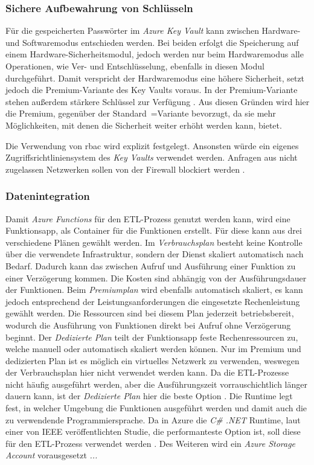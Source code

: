 \subsubsection{Sichere Aufbewahrung von Schlüsseln} \label{subsec:umsetzen:konfiguration:keyVault}
Für die gespeicherten Passwörter im \textit{Azure Key Vault} kann zwischen Hardware- und Softwaremodus entschieden werden. Bei beiden erfolgt die Speicherung auf einem Hardware-Sicherheitsmodul, jedoch werden nur beim Hardwaremodus alle Operationen, wie Ver- und Entschlüsselung, ebenfalls in diesen Modul durchgeführt. Damit verspricht der Hardwaremodus eine höhere Sicherheit, setzt jedoch die Premium-Variante des Key Vaults voraus. In der Premium-Variante stehen außerdem stärkere Schlüssel zur Verfügung \cite{haunts_key_2019}. Aus diesen Gründen wird hier die Premium, gegenüber der Standard~=Variante bevorzugt, da sie mehr Möglichkeiten, mit denen die Sicherheit weiter erhöht werden kann, bietet.

Die Verwendung von \ac{rbac} wird explizit festgelegt. Ansonsten würde ein eigenes Zugriffsrichtliniensystem des \textit{Key Vaults} verwendet werden. Anfragen aus nicht zugelassen Netzwerken sollen von der Firewall blockiert werden \cite[vgl.][]{herath_working_2022}.

\subsubsection{Datenintegration} \label{subsec:umsetzen:konfiguration:functions}
Damit \textit{Azure Functions} für den ETL-Prozess genutzt werden kann, wird eine Funktionsapp, als Container für die Funktionen erstellt. Für diese kann aus drei verschiedene Plänen gewählt werden. Im \textit{Verbrauchsplan} besteht keine Kontrolle über die verwendete Infrastruktur, sondern der Dienst skaliert automatisch nach Bedarf. Dadurch kann das zwischen Aufruf und Ausführung einer Funktion zu einer Verzögerung kommen. Die Kosten sind abhängig von der Ausführungsdauer der Funktionen. Beim \textit{Premiumplan} wird ebenfalls automatisch skaliert, es kann jedoch entsprechend der Leistungsanforderungen die eingesetzte Rechenleistung gewählt werden. Die Ressourcen sind bei diesem Plan jederzeit betriebsbereit, wodurch die Ausführung von Funktionen direkt bei Aufruf ohne Verzögerung beginnt. Der \textit{Dedizierte Plan} teilt der Funktionsapp feste Rechenressourcen zu, welche manuell oder automatisch skaliert werden können. Nur im Premium und dedizierten Plan ist es möglich ein virtuelles Netzwerk zu verwenden, weswegen der Verbrauchsplan hier nicht verwendet werden kann. Da die ETL-Prozesse nicht häufig ausgeführt werden, aber die Ausführungszeit vorrauschichtlich länger dauern kann, ist der \textit{Dedizierte Plan} hier die beste Option \cite[vgl.][]{satapathi_hands-azure_2021}. Die Runtime legt fest, in welcher Umgebung die Funktionen ausgeführt werden und damit auch die zu verwendende Programmiersprache. Da in Azure die \textit{C\# .NET} Runtime, laut einer von IEEE veröffentlichten Studie, die performanteste Option ist, soll diese für den ETL-Prozess verwendet werden \cite[vgl.][]{jackson_investigation_2018}. Des Weiteren wird ein \textit{Azure Storage Account} vorausgesetzt \textit{...}

